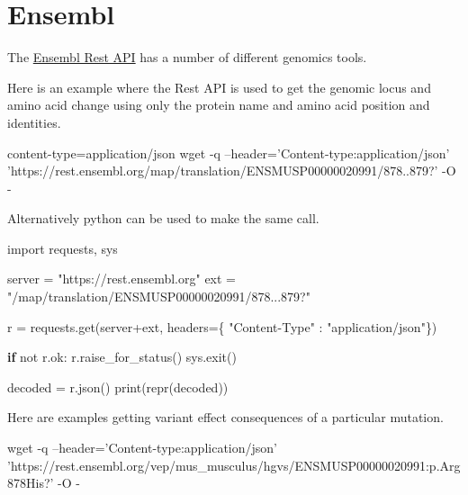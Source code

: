 \documentclass[]{book}
\newenvironment{Shaded}{\begin{snugshade}}{\end{snugshade}}
\newcommand{\ExtensionTok}[1]{#1}
\newcommand{\FunctionTok}[1]{\textcolor[rgb]{0.00,0.00,0.00}{#1}}
\newcommand{\KeywordTok}[1]{\textcolor[rgb]{0.13,0.29,0.53}{\textbf{#1}}}
\newcommand{\NormalTok}[1]{#1}
\newcommand{\StringTok}[1]{\textcolor[rgb]{0.31,0.60,0.02}{#1}}
\begin{document}
\hypertarget{ensembl}{%
\section{Ensembl}\label{ensembl}}

The \href{https://rest.ensembl.org/}{Ensembl Rest API} has a number of different genomics tools.

Here is an example where the Rest API is used to get the genomic locus and amino acid change using only the protein name and amino acid position and identities.

\begin{Shaded}
\begin{Highlighting}[]
\ExtensionTok{content-type}\NormalTok{=application/json}
\FunctionTok{wget}\NormalTok{ -q --header=}\StringTok{'Content-type:application/json'} \StringTok{'https://rest.ensembl.org/map/translation/ENSMUSP00000020991/878..879?'}\NormalTok{  -O -}
\end{Highlighting}
\end{Shaded}

Alternatively python can be used to make the same call.

\begin{Shaded}
\begin{Highlighting}[]
\ExtensionTok{import}\NormalTok{ requests, sys}
 
\ExtensionTok{server}\NormalTok{ = }\StringTok{"https://rest.ensembl.org"}
\ExtensionTok{ext}\NormalTok{ = }\StringTok{"/map/translation/ENSMUSP00000020991/878...879?"}
 
\ExtensionTok{r}\NormalTok{ = requests.get(server+ext, headers=\{ }\StringTok{"Content-Type"}\NormalTok{ : }\StringTok{"application/json"}\NormalTok{\})}
 
\KeywordTok{if} \ExtensionTok{not}\NormalTok{ r.ok:}
  \ExtensionTok{r.raise_for_status}\NormalTok{()}
  \ExtensionTok{sys.exit}\NormalTok{()}
 
\ExtensionTok{decoded}\NormalTok{ = r.json()}
\ExtensionTok{print}\NormalTok{(repr(decoded))}
\end{Highlighting}
\end{Shaded}

Here are examples getting variant effect consequences of a particular mutation.

\begin{Shaded}
\begin{Highlighting}[]
\FunctionTok{wget}\NormalTok{ -q --header=}\StringTok{'Content-type:application/json'} \StringTok{'https://rest.ensembl.org/vep/mus_musculus/hgvs/ENSMUSP00000020991:p.Arg878His?'}\NormalTok{  -O -}
\end{Highlighting}
\end{Shaded}
\end{document}
